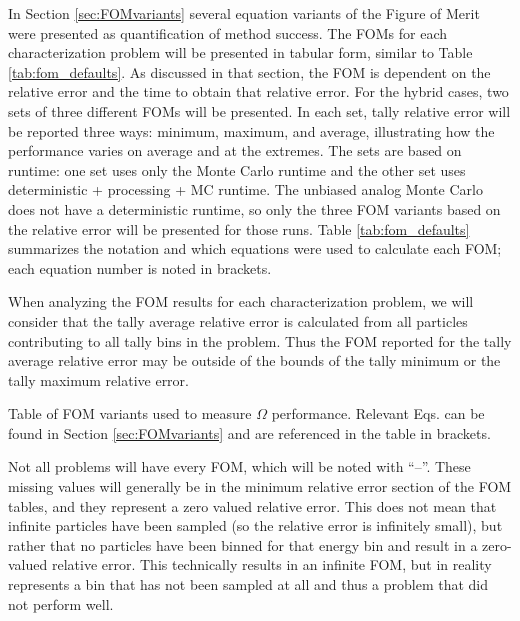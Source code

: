 In Section \ref{sec:FOMvariants} several equation variants of
the Figure of Merit were
presented as quantification of method success. The FOMs for each
characterization problem will be presented in tabular form, similar to Table
\ref{tab:fom_defaults}. As discussed in that section, the FOM is dependent on
the relative error and the time to obtain that relative error. For the hybrid
cases, two sets of three different FOMs will be presented. In each set, tally relative error will be reported three ways: minimum, maximum, and average, illustrating how the performance varies on average and at the extremes.   
The sets are based on runtime: one set uses only the Monte Carlo runtime and the other set uses deterministic + processing + MC runtime. 
The
unbiased analog Monte Carlo does not have a deterministic runtime, so only the
three FOM variants based on the relative error will be presented for those runs.
Table \ref{tab:fom_defaults} summarizes the notation and which
equations were used to calculate each FOM; each equation number is noted
in brackets.

When analyzing the FOM results for each characterization problem,
we will consider that the tally average relative error is calculated from all
particles contributing to all tally bins in the problem. Thus the FOM reported
for the tally average relative error may be outside of the bounds of the tally
minimum or the tally maximum relative error.

\begin{table}[h!]
  \centering
  
  \caption[Table of FOM variants used to measure $\Omega$ performance.]{
  Table of FOM variants used to measure $\Omega$ performance. Relevant Eqs. can
  be found in Section \ref{sec:FOMvariants} and are referenced in the table in
  brackets.}
  \label{tab:fom_defaults}
\end{table}

Not all problems will have every FOM, which will be noted with ``--''.  These missing values will generally be in the minimum relative error
section of the FOM tables, and they represent a zero valued relative error. This
does not mean that infinite particles have been sampled (so the relative error
is infinitely small), but rather that no particles have been binned for that
energy bin and result in a zero-valued relative error.
This technically results in an infinite FOM, but in reality
represents a bin that has not been sampled at all and thus 
a problem that did not perform well.

